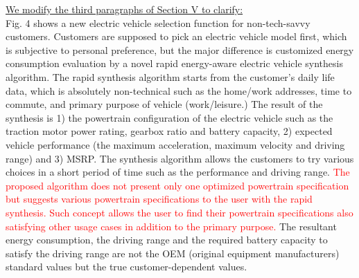 \documentclass[onecolumn]{IEEEconf}
\begin{document}
\begin{description}
\underline{We modify the third paragraphs of Section V to clarify:}\\
Fig. 4 shows a new electric vehicle selection function for non-tech-savvy customers. Customers are supposed to pick an electric vehicle model first, which is subjective to personal preference, but the major difference is customized energy consumption evaluation by a novel rapid energy-aware electric vehicle synthesis algorithm. The rapid synthesis algorithm starts from the customer’s daily life data, which is absolutely non-technical such as the home/work addresses, time to commute, and primary purpose of vehicle (work/leisure.) The result of the synthesis is 1) the powertrain configuration of the electric vehicle such as the traction motor power rating, gearbox ratio and battery capacity, 2) expected vehicle performance (the maximum acceleration, maximum velocity and driving range) and 3) MSRP. The synthesis algorithm allows the customers to try various choices in a short period of time such as the performance and driving range. 
\textcolor{red}{The proposed algorithm does not present only one optimized powertrain specification but suggests various powertrain specifications to the user with the rapid synthesis. Such concept allows the user to find their powertrain specifications also satisfying other usage cases in addition to the primary purpose.}
The resultant energy consumption, the driving range and the required battery capacity to satisfy the driving range are not the OEM (original equipment manufacturers) standard values but the true customer-dependent values. 

\end{description}

\pagebreak
\end{document}
